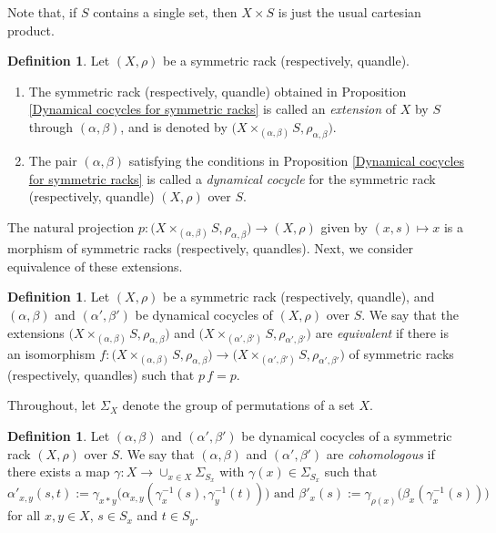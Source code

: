 \documentclass[11pt,reqno]{amsart}
\theoremstyle{definition}
\newtheorem{definition}[theorem]{Definition}
\numberwithin{equation}{subsection}
\begin{document}
Note that, if $S$ contains a single set, then $X \times S$ is just the usual cartesian product.

 \begin{definition}
Let $(X, \rho)$ be a symmetric rack (respectively, quandle).  
\begin{enumerate}
\item The symmetric rack (respectively, quandle) obtained in Proposition \ref{Dynamical cocycles for symmetric racks} is called an {\it extension} of $X$ by $S$ through $(\alpha,\beta)$, and is denoted by $\big(X \times_{(\alpha,\beta)}S,\rho_{\alpha,\beta}\big).$
\item  The pair $(\alpha,\beta)$ satisfying the conditions in Proposition \ref{Dynamical cocycles for symmetric racks} is called a {\it dynamical cocycle} for the symmetric rack (respectively, quandle) $(X,\rho)$ over $S$. 
\end{enumerate}
 \end{definition}

 The natural projection $p:\big(X \times_{(\alpha,\beta)}S,\rho_{\alpha,\beta}\big) \rightarrow (X,\rho)$ given by $(x,s) \mapsto x$ is a morphism of symmetric racks (respectively, quandles). Next, we consider equivalence of these extensions.

\begin{definition}
Let $(X,\rho)$ be a symmetric rack (respectively, quandle), and $(\alpha,\beta)$ and $(\alpha',\beta')$ be dynamical cocycles of $(X,\rho)$ over $S$. We say that the extensions $\big(X \times_{(\alpha,\beta)}S,\rho_{\alpha,\beta}\big)$ and $\big(X \times_{(\alpha',\beta')}S,\rho_{\alpha',\beta'}\big)$ are {\it equivalent} if there is an isomorphism $f:\big(X \times_{(\alpha,\beta)}S,\rho_{\alpha,\beta}\big) \rightarrow \big(X \times_{(\alpha',\beta')}S,\rho_{\alpha',\beta'}\big)$ of symmetric racks (respectively, quandles) such that $p \, f =p.$
\end{definition}

Throughout, let $\Sigma_X$ denote the group of permutations of a set $X$.

\begin{definition}\label{dynamical cohomlogous}
Let $(\alpha,\beta)$ and $(\alpha',\beta')$ be  dynamical cocycles of a symmetric rack $(X,\rho)$ over $S$. We say that $(\alpha,\beta)$ and $(\alpha',\beta')$ are {\it cohomologous} if there exists a map $\gamma:X \rightarrow \cup_{x \in X}\Sigma_{S_x}$ with $\gamma(x) \in \Sigma_{S_x}$ such that 
	\begin{equation}\label{cohomologous dynamical cocycle}
		\alpha'_{x,y}(s,t):= \gamma_{x*y}\big(\alpha_{x,y}(\gamma_x^{-1}(s),\gamma_y^{-1}(t))\big)
		\text{ and }
		\beta'_x(s):=\gamma_{\rho(x)}\big(\beta_x(\gamma_x^{-1}(s))\big)
	\end{equation}
for all $x,y \in X$, $s\in S_x$ and $t \in S_y$. 
\end{definition}
\end{document}
